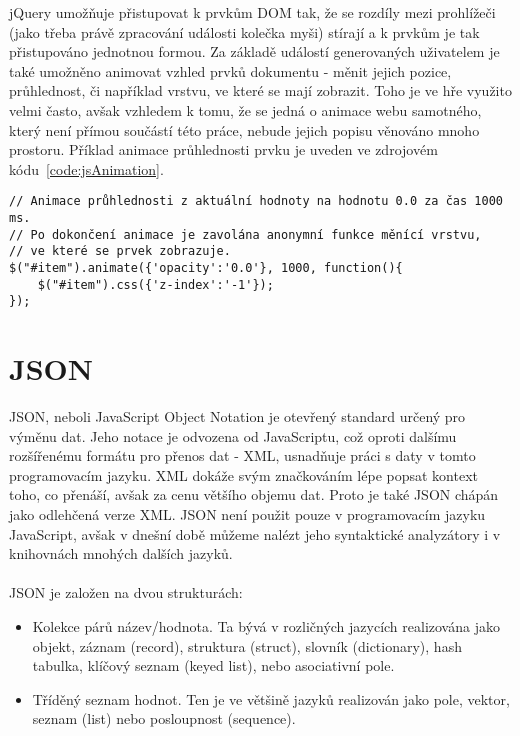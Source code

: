 jQuery umožňuje přistupovat k prvkům DOM tak, že se rozdíly mezi prohlížeči (jako třeba právě zpracování události kolečka myši) stírají a k prvkům je tak přistupováno jednotnou formou. Za základě událostí generovaných uživatelem je také umožněno animovat vzhled prvků dokumentu - měnit jejich pozice, průhlednost, či například vrstvu, ve které se mají zobrazit. Toho je ve hře využito velmi často, avšak vzhledem k tomu, že se jedná o animace webu samotného, který není přímou součástí této práce, nebude jejich popisu věnováno mnoho prostoru. Příklad animace průhlednosti prvku je uveden ve zdrojovém kódu~\ref{code:jsAnimation}.

\begin{lstlisting}[caption=jQuery Animace,label=code:jsAnimation]
// Animace průhlednosti z aktuální hodnoty na hodnotu 0.0 za čas 1000 ms.
// Po dokončení animace je zavolána anonymní funkce měnící vrstvu,
// ve které se prvek zobrazuje.
$("#item").animate({'opacity':'0.0'}, 1000, function(){
    $("#item").css({'z-index':'-1'});
});
\end{lstlisting}

\section{JSON}
\label{section:JSON}
JSON, neboli JavaScript Object Notation je otevřený standard určený pro výměnu dat. Jeho notace je odvozena od JavaScriptu, což oproti dalšímu rozšířenému formátu pro přenos dat - XML, usnadňuje práci s daty v tomto programovacím jazyku. XML dokáže svým značkováním lépe popsat kontext toho, co přenáší, avšak za cenu většího objemu dat. Proto je také JSON chápán jako odlehčená verze XML. JSON není použit pouze v programovacím jazyku JavaScript, avšak v dnešní době můžeme nalézt jeho syntaktické analyzátory i v knihovnách mnohých dalších jazyků.\cite{flanagan2006javascript} \\ \\
JSON je založen na dvou strukturách:
\begin{itemize}
\item Kolekce párů název/hodnota. Ta bývá v rozličných jazycích realizována jako objekt, záznam (record), struktura (struct), slovník (dictionary), hash tabulka, klíčový seznam (keyed list), nebo asociativní pole.
\item Tříděný seznam hodnot. Ten je ve většině jazyků realizován jako pole, vektor, seznam (list) nebo posloupnost (sequence).
\end{itemize}

